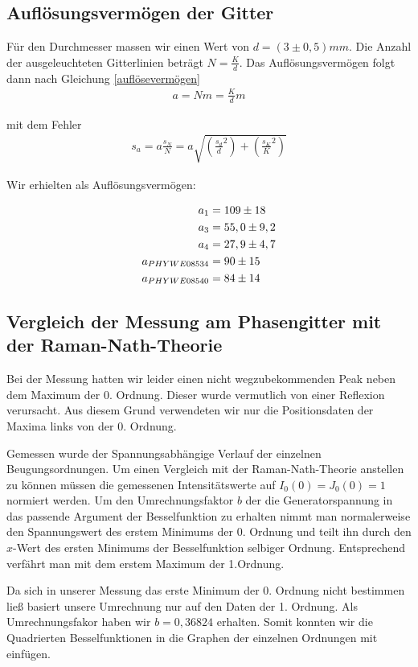 \documentclass[12pt]{article}
\begin{document}
\subsection{Auflösungsvermögen der Gitter}
Für den Durchmesser massen wir einen Wert von $d=(3 \pm 0,5)mm$. Die Anzahl der ausgeleuchteten Gitterlinien beträgt
$N=\frac{K}{d}$. Das Auflösungsvermögen folgt dann nach Gleichung \ref{auflösevermögen} 
\begin{align}
 a=Nm=\frac{K}{d}m
\end{align}

mit dem Fehler 
\begin{align}
 s_a=a\frac{s_N}{N}=a\sqrt{\left( \frac{s_d}{d}^2 \right) + \left( \frac{s_K}{K}^2 \right) }
\end{align}

Wir erhielten als Auflösungsvermögen:

\begin{align}
 \notag
a_1 &=  109 \pm  18\\
 \notag
a_3 &=  55,0 \pm  9,2\\
 \notag
a_4 &=  27,9 \pm  4,7\\
 \notag
a_{PHYWE08534} &= 90 \pm 15\\
 \notag
a_{PHYWE08540} &= 84 \pm 14
\end{align}

\subsection{Vergleich der Messung am Phasengitter mit der Raman-Nath-Theorie}
Bei der Messung hatten wir leider einen nicht wegzubekommenden Peak neben dem Maximum der 0. Ordnung. Dieser wurde vermutlich von einer Reflexion
verursacht. Aus diesem Grund verwendeten wir nur die Positionsdaten der Maxima links von der 0. Ordnung.

Gemessen wurde der Spannungsabhängige Verlauf der einzelnen Beugungsordnungen. Um einen Vergleich mit der Raman-Nath-Theorie anstellen zu können müssen
die gemessenen Intensitätswerte auf $I_0(0) = J_0(0) = 1$ normiert werden. Um den Umrechnungsfaktor $b$ der die Generatorspannung in das passende Argument
der Besselfunktion zu erhalten nimmt man normalerweise den Spannungswert des erstem Minimums der 0. Ordnung und teilt ihn durch den $x$-Wert des ersten
Minimums der Besselfunktion selbiger Ordnung. Entsprechend verfährt man mit dem erstem Maximum der 1.Ordnung. 

Da sich in unserer Messung das erste Minimum der 0. Ordnung nicht bestimmen ließ basiert unsere Umrechnung nur auf den Daten der 1. Ordnung.
Als Umrechnungsfakor haben wir $b = 0,36824$ erhalten. Somit konnten wir die Quadrierten Besselfunktionen in die Graphen der einzelnen Ordnungen mit 
einfügen.
\end{document}
